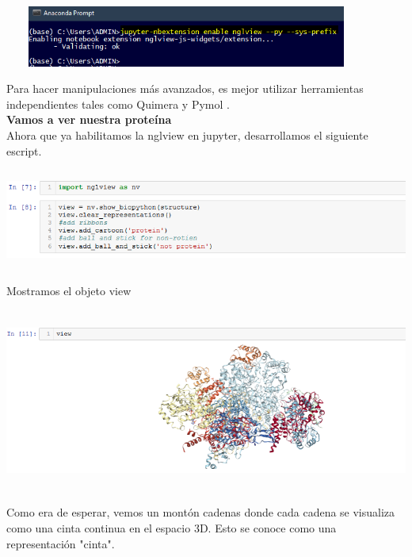 \documentclass[a4paper]{article}
\begin{document}
\begin{center}
	\includegraphics[width=12cm,height=2cm]{JProtein.png}
\end{center}

Para hacer manipulaciones más avanzados, es mejor utilizar herramientas independientes tales como Quimera y Pymol .\\

\noindent\textbf{Vamos a ver nuestra proteína}\\

\noindent Ahora que ya habilitamos la nglview en jupyter, desarrollamos el siguiente escript.

\begin{center}
	\includegraphics[width=16cm,height=3.3cm]{scriptView.png}
\end{center}

Mostramos el objeto view

\begin{center}
	\includegraphics[width=16cm,height=6cm]{protein0.png}
\end{center}

Como era de esperar, vemos un montón cadenas donde cada cadena se visualiza como una cinta continua en el espacio 3D. Esto se conoce como una representación "cinta".
\end{document}
